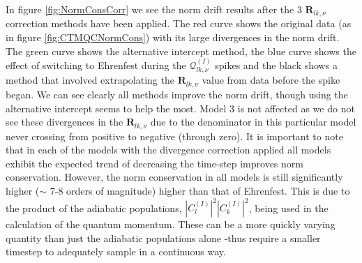 In figure \ref{fig:NormConsCorr} we see the norm drift results after the 3 $\mathbf{R}_{lk, \nu}$ correction methods have been applied. The red curve shows the original data (as in figure \ref{fig:CTMQCNormCons}) with its large divergences in the norm drift. The green curve shows the alternative intercept method, the blue curve shows the effect of switching to Ehrenfest during the $\mathcal{Q}_{lk, \nu}^{(I)}$ spikes and the black shows a method that involved extrapolating the $\mathbf{R}_{lk, \nu}$ value from data before the spike began. We can see clearly all  methods improve the norm drift, though using the alternative intercept seems to help the most. Model 3 is not affected as we do not see these divergences in the $\mathbf{R}_{lk, \nu}$ due to the denominator in this particular model never crossing from positive to negative (through zero). It is important to note that in each of the models with the divergence correction applied all models exhibit the expected trend of decreasing the time-step improves norm conservation. However, the norm conservation in all  models is still significantly higher ($\sim$ 7-8 orders of magnitude) higher than that of Ehrenfest.  This is due to the product of the adiabatic populations, $|C_{l}^{(I)}|^2 |C_{k}^{(I)}|^2$, being used in the calculation of the quantum momentum. These can be a more quickly varying quantity than just the adiabatic populations alone -thus require a smaller timestep to adequately sample in a continuous way.

